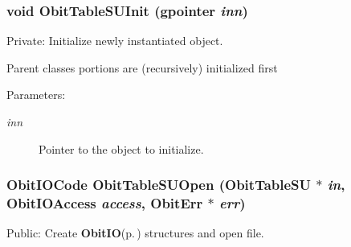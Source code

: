 \subsubsection{\setlength{\rightskip}{0pt plus 5cm}void Obit\-Table\-SUInit (gpointer {\em inn})}\label{ObitTableSU_8c_a8}


Private: Initialize newly instantiated object. 

Parent classes portions are (recursively) initialized first \begin{Desc}
\item[Parameters:]
\begin{description}
\item[{\em inn}]Pointer to the object to initialize. \end{description}
\end{Desc}
\subsubsection{\setlength{\rightskip}{0pt plus 5cm}Obit\-IOCode Obit\-Table\-SUOpen ({\bf Obit\-Table\-SU} $\ast$ {\em in}, Obit\-IOAccess {\em access}, {\bf Obit\-Err} $\ast$ {\em err})}\label{ObitTableSU_8c_a21}


Public: Create {\bf Obit\-IO}{\rm (p.\,\pageref{structObitIO})} structures and open file. 

